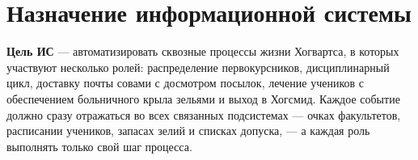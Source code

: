 \documentclass[a4paper,12pt]{article}
\begin{document}
\section{Назначение информационной системы}
 
 
\textbf{Цель ИС} — автоматизировать сквозные процессы жизни Хогвартса, в которых
участвуют несколько ролей: распределение первокурсников, дисциплинарный цикл,
доставку почты совами с досмотром посылок, лечение учеников с обеспечением
больничного крыла зельями и выход в Хогсмид. Каждое событие должно сразу
отражаться во всех связанных подсистемах — очках факультетов, расписании учеников,
запасах зелий и списках допуска, — а каждая роль выполнять только свой шаг процесса.
 
\end{document}
